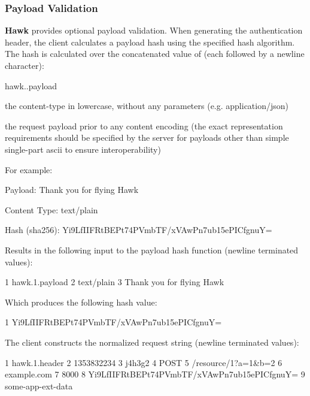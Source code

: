 \subsubsection*{Payload Validation}

{\bfseries Hawk} provides optional payload validation. When generating the authentication header, the client calculates a payload hash using the specified hash algorithm. The hash is calculated over the concatenated value of (each followed by a newline character)\+:
\begin{DoxyItemize}
\item {\ttfamily hawk..\+payload}
\item the content-\/type in lowercase, without any parameters (e.\+g. {\ttfamily application/json})
\item the request payload prior to any content encoding (the exact representation requirements should be specified by the server for payloads other than simple single-\/part ascii to ensure interoperability)
\end{DoxyItemize}

For example\+:


\begin{DoxyItemize}
\item Payload\+: {\ttfamily Thank you for flying Hawk}
\item Content Type\+: {\ttfamily text/plain}
\item Hash (sha256)\+: {\ttfamily Yi9\+Lf\+I\+I\+F\+Rt\+B\+E\+Pt74\+P\+Vmb\+T\+F/x\+V\+Aw\+Pn7ub15e\+P\+I\+Cfgnu\+Y=}
\end{DoxyItemize}

Results in the following input to the payload hash function (newline terminated values)\+:


\begin{DoxyCode}
1 hawk.1.payload
2 text/plain
3 Thank you for flying Hawk
\end{DoxyCode}


Which produces the following hash value\+:


\begin{DoxyCode}
1 Yi9LfIIFRtBEPt74PVmbTF/xVAwPn7ub15ePICfgnuY=
\end{DoxyCode}


The client constructs the normalized request string (newline terminated values)\+:


\begin{DoxyCode}
1 hawk.1.header
2 1353832234
3 j4h3g2
4 POST
5 /resource/1?a=1&b=2
6 example.com
7 8000
8 Yi9LfIIFRtBEPt74PVmbTF/xVAwPn7ub15ePICfgnuY=
9 some-app-ext-data
\end{DoxyCode}



